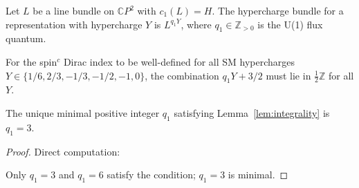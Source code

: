 \begin{definition}
Let $L$ be a line bundle on $\mathbb{C}P^2$ with $c_1(L) = H$. The hypercharge bundle for a representation with hypercharge $Y$ is $L^{q_1 Y}$, where $q_1 \in \mathbb{Z}_{>0}$ is the U(1) flux quantum.
\end{definition}

\begin{lemma}\label{lem:integrality}
For the spin$^c$ Dirac index to be well-defined for all SM hypercharges $Y \in \{1/6, 2/3, -1/3, -1/2, -1, 0\}$, the combination $q_1 Y + 3/2$ must lie in $\frac{1}{2}\mathbb{Z}$ for all $Y$.
\end{lemma}

\begin{lemma}[$q_1 = 3$ is Uniquely Minimal]\label{lem:q1}
The unique minimal positive integer $q_1$ satisfying Lemma~\ref{lem:integrality} is $q_1 = 3$.
\end{lemma}

\begin{proof}
Direct computation:

\begin{table}[h]
\centering
\caption{Charge combinations for various hypercharge assignments.}\label{tab:q1-Y-table}
\end{table}

Only $q_1 = 3$ and $q_1 = 6$ satisfy the condition; $q_1 = 3$ is minimal.
\end{proof}

